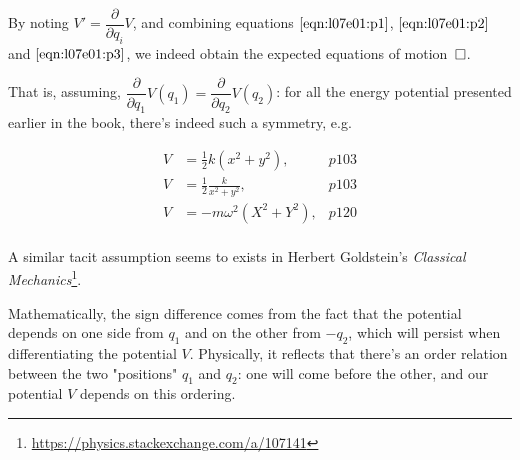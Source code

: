 \documentclass[solutions.tex]{subfiles}
\begin{document}
By noting $V' = \dfrac{\partial}{\partial q_i}V$, and combining equations
$\eqref{eqn:l07e01:p1}$, $\eqref{eqn:l07e01:p2}$ and $\eqref{eqn:l07e01:p3}$,
we indeed obtain the expected equations of motion $\qed$.

\begin{remark}
That is, assuming, $\dfrac{\partial}{\partial q_1}V(q_1) =
\dfrac{\partial}{\partial q_2}V(q_2)$: for all the energy
potential presented earlier in the book, there's indeed such
a symmetry, e.g.

\begin{align*}
	V &= \frac{1}{2}k(x^2+y^2),& p103 \\
	V &= \frac{1}{2}\frac{k}{x^2+y^2},& p103 \\
	V &= -m \omega^2 (X^2+Y^2),& p120 \\
\end{align*}

A similar tacit assumption seems to exists in Herbert Goldstein's
\textit{Classical Mechanics}\footnote{\url{https://physics.stackexchange.com/a/107141}}.

\end{remark}

Mathematically, the sign difference comes from the fact that the
potential depends on one side from $q_1$ and on the other from $-q_2$,
which will persist when differentiating the potential $V$. Physically,
it reflects that there's an order relation between the two "positions"
$q_1$ and $q_2$: one will come before the other, and our potential $V$
depends on this ordering.
\end{document}
